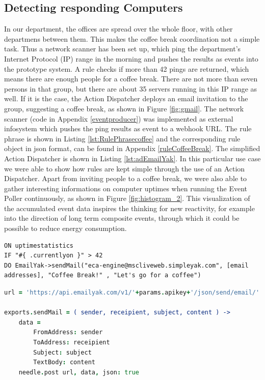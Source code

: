 \subsection{Detecting responding Computers}
In our department, the offices are spread over the whole floor, with other departmens between them.
This makes the coffee break coordination not a simple task.
Thus a network scanner has been set up, which ping the department's \textrm{Internet Protocol (IP)} range in the morning and pushes the results as events into the prototype system.
A rule checks if more than 42 pings are returned, which means there are enough people for a coffee break.
There are not more than seven persons in that group, but there are about 35 servers running in this IP range as well.
If it is the case, the \textrm{Action Dispatcher} deploys an email invitation to the group, suggesting a coffee break, as shown in Figure \ref{fig:gmail}.
The network scanner (code in Appendix \ref{eventproducer}) was implemented as external \textrm{\gls{infosystem}} which pushes the ping results as event to a \textrm{\gls{webhook} URL}.
The rule phrase is shown in Listing \ref{lst:RulePhrasecoffee} and the corresponding rule object in \textrm{\acrshort{json}} format, can be found in Appendix \ref{ruleCoffeeBreak}.
The simplified \textrm{Action Dispatcher} is shown in Listing \ref{lst:adEmailYak}.
In this particular use case we were able to show how rules are kept simple through the use of an \textrm{Action Dispatcher}.
Apart from inviting people to a coffee break, we were also able to gather interesting informations on computer uptimes when running the \textrm{Event Poller} continuously, as shown in Figure \ref{fig:histogram_2}.
This visualization of the accumulated event data inspires the thinking for new reactivity, for example into the direction of long term composite events, through which it could be possible to reduce energy consumption.


\begin{lstlisting}[float=h,language=OwnRule,label={lst:RulePhrasecoffee},caption=Rule Phrase for Coffee Break Invitation]
ON uptimestatistics
IF "#{ .currentlyon }" > 42
DO EmailYak->sendMail("eca-engine@mscliveweb.simpleyak.com", [email addresses], "Coffee Break!" , "Let's go for a coffee")
\end{lstlisting}

\begin{lstlisting}[float=h,language=CoffeeScript,caption={Action Dispatcher; EmailYak, in CoffeeScript},label={lst:adEmailYak}]
url = 'https://api.emailyak.com/v1/'+params.apikey+'/json/send/email/'

exports.sendMail = ( sender, receipient, subject, content ) ->
	data =
		FromAddress: sender
		ToAddress: receipient
		Subject: subject
		TextBody: content
	needle.post url, data, json: true
\end{lstlisting}

